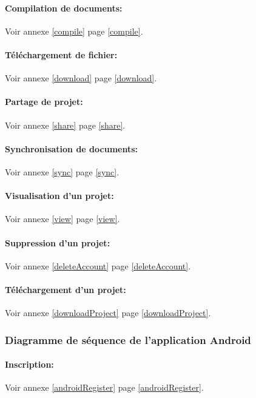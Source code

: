 \documentclass[a4paper,12pt]{article}
\begin{document}
\paragraph{Compilation de documents:\\}
Voir annexe \ref{compile} page \ref{compile}.

\paragraph{Téléchargement de fichier:\\}
Voir annexe \ref{download} page \ref{download}.

\paragraph{Partage de projet:\\}
Voir annexe \ref{share} page \ref{share}.

\paragraph{Synchronisation de documents:\\}
Voir annexe \ref{sync} page \ref{sync}.

\paragraph{Visualisation d'un projet:\\}
Voir annexe \ref{view} page \ref{view}.

\paragraph{Suppression d'un projet:\\}
Voir annexe \ref{deleteAccount} page \ref{deleteAccount}.

\paragraph{Téléchargement d'un projet:\\}
Voir annexe \ref{downloadProject} page \ref{downloadProject}.

\subsubsection{Diagramme de séquence de l'application Android}

\paragraph{Inscription:\\}
Voir annexe \ref{androidRegister} page \ref{androidRegister}.
\end{document}
